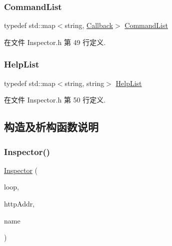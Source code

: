 \subsubsection{\texorpdfstring{Command\+List}{CommandList}}
{\footnotesize\ttfamily typedef std\+::map$<$string, \hyperlink{classmuduo_1_1net_1_1Inspector_a9b3d030deba315670a7da29b78586217}{Callback}$>$ \hyperlink{classmuduo_1_1net_1_1Inspector_a00ae736a47d9b5825c815a1c8aeeaeab}{Command\+List}\hspace{0.3cm}{\ttfamily [private]}}



在文件 Inspector.\+h 第 49 行定义.

\mbox{\label{classmuduo_1_1net_1_1Inspector_a45483c7152afba31eaf21e58681f619e}} 
\subsubsection{\texorpdfstring{Help\+List}{HelpList}}
{\footnotesize\ttfamily typedef std\+::map$<$string, string$>$ \hyperlink{classmuduo_1_1net_1_1Inspector_a45483c7152afba31eaf21e58681f619e}{Help\+List}\hspace{0.3cm}{\ttfamily [private]}}



在文件 Inspector.\+h 第 50 行定义.



\subsection{构造及析构函数说明}
\mbox{\label{classmuduo_1_1net_1_1Inspector_a42616b7b1bc438718f4924033c1f3267}} 
\subsubsection{\texorpdfstring{Inspector()}{Inspector()}}
{\footnotesize\ttfamily \hyperlink{classmuduo_1_1net_1_1Inspector}{Inspector} (\begin{DoxyParamCaption}\item[{\hyperlink{classmuduo_1_1net_1_1EventLoop}{Event\+Loop} $\ast$}]{loop,  }\item[{const \hyperlink{classmuduo_1_1net_1_1InetAddress}{Inet\+Address} \&}]{http\+Addr,  }\item[{const string \&}]{name }\end{DoxyParamCaption})}

